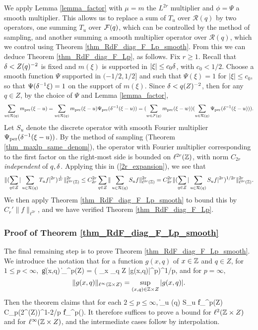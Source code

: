 \documentclass[oneside,11pt]{amsart}
\newcommand{\Rcal}{\mathcal{R}}
\begin{document}
We apply Lemma \ref{lemma_factor} with $\mu=m$ the $L^{2r}$ multiplier and $\phi = \Psi$ a smooth multiplier. This allows us to replace a sum of  $T_u$ over $\Rcal(q)$ by two operators, one summing $T_u$ over $\mathcal{F}(q)$, which can be controlled by the method of sampling, and another summing a smooth multiplier operator over $\Rcal(q)$, which we control using Theorem \ref{thm_RdF_diag_F_Lp_smooth}. From this we can  deduce Theorem \ref{thm_RdF_diag_F_Lp}, as follows. Fix $r \geq 1$. Recall that $\delta< Z(q)^{-2}$ is fixed  and $m(\xi)$ is supported in $|\xi| \leq c_0 \delta$, with $c_0< 1/2$. Choose a smooth function $\Psi$ supported in $(-1/2,1/2]$ and such that  $\Psi(\xi) = 1$ for $|\xi| \leq c_0$, so that $\Psi(\delta^{-1}\xi )=1$ on the support of $m(\xi )$.  Since $\delta < q(Z)^{-2}$, 
then for any  $q \in Z$, by the choice of $\Psi$ and Lemma \ref{lemma_factor},
\[
  \sum_{u \in \Rcal(q)} m_{\mathrm{per}}(\xi - u)  
   = \sum_{u \in \Rcal(q)} m_{\mathrm{per}}(\xi - u)  \Psi_{\mathrm{per}}(\del^{-1}(\xi-u))
 	=   (\sum_{w \in \Fcal(q)} m_{\mathrm{per}}(\xi-w) ) (\sum_{u \in \Rcal(q)} \Psi_{\mathrm{per}}(\del^{-1}(\xi - u) )).
\]
Let $S_u$ denote the discrete operator with smooth Fourier multiplier $\Psi_{\mathrm{per}}(\delta^{-1}(\xi - u))$.
By the method of sampling (Theorem \ref{thm_maxlp_same_denom}),   the operator with Fourier multiplier corresponding to the first factor  on the right-most side is bounded on $\ell^{2r}(\mathbb{Z})$, with norm $C_{2r}$ \emph{independent} of $q, \delta$. 
Applying this in (\ref{2r_expansion}), we see that
 \[  \|(\sum_{q \in Z}  | \sum_{u \in \Rcal(q)} T_{u} f |^{2r})^{\frac{1}{2r}}\|^{2r}_{\ell^{2r}(\Z)} 
 \leq C_{2r}^{2r}  \sum_{ q \in Z} \| \sum_{u \in \Rcal(q)} S_{u} f \|^{2r}_{\ell^{2r}(\Z)} = C_{2r}^{2r}\| ( \sum_{q \in Z} | \sum_{u \in \Rcal(q)} S_u f|^{2r})^{1/2r} \|_{\ell^{2r}(\Z)}^{2r}. \]
We then apply Theorem  \ref{thm_RdF_diag_F_Lp_smooth} to bound this by $C_r' \|f\|_{\ell^{2r}}$,
and we have verified Theorem  \ref{thm_RdF_diag_F_Lp}.
	
 \subsubsection{Proof of Theorem  \ref{thm_RdF_diag_F_Lp_smooth}}
 The final remaining step is to prove Theorem \ref{thm_RdF_diag_F_Lp_smooth}.
We introduce the notation  that for a function $g(x,q)$ of $x \in \mathbb{Z}$ and $q \in Z$,   for $1 \leq p < \infty,$
\beq\label{RdF_mixed_norm_dfn}
 \| g(x,q) \|_{\ell^p(\Z \times Z)} = ( \sum_{x \in \Z} \sum_{q \in Z} |g(x,q)|^p)^{1/p},
 \eeq
 and for $p=\infty,$  
\[  \| g(x,q) \|_{\ell^\infty(\mathbb{Z} \times Z)} = \sup_{(x,q) \in \mathbb{Z} \times Z} |g(x,q)|.\]
Then the theorem claims that for each  $2 \leq p \leq \infty$,  
\beq\label{RdF_diag_p}
  \| \sum_{u \in \Rcal(q)} S_u f\|_{\ell^{p}(\Z \times Z)}
	\leq C_p(2^{\Omega(Z)})^{1-2/p} \| f\|_{\ell^{p}(\Z)}.
	\eeq
It therefore suffices to prove a bound  for $\ell^2(\mathbb{Z} \times Z)$ and for $\ell^\infty(\mathbb{Z} \times Z)$, and the intermediate cases follow by interpolation. 
\end{document}
